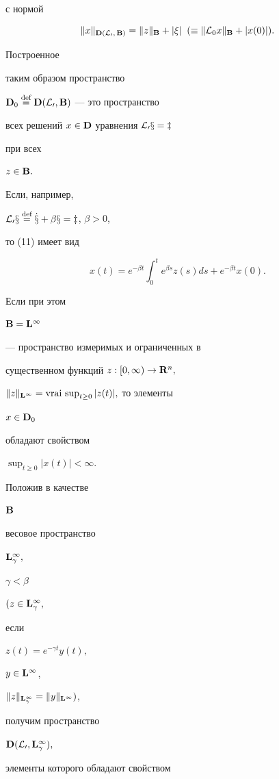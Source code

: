 с нормой


$$


\|x\|_{\bold D(\cal L_0,\,\bold B)}=\|z\|_{\bold B}+|\xi|\;\;


(\equiv\|{\cal L}_0 x\|_{\bold B}+|x(0)|).


$$


Построенное


таким образом пространство


$\bold D_0\overset{\text{def}}{=} \bold D(\cal L_0,\bold B)$ --- это пространство


всех решений $x\in\bold D$ уравнения $\cal L_0 x= z$


при всех


$z\in\bold B.$


Если, например,


$\cal L_0 x\overset{\text{def}}{=} \Dot x +\beta x = z$, $\beta > 0$,


то (11) имеет вид


$$


x(t) = e^{-\beta t} \int_0^t e^{\beta s}z(s)ds +e^{-\beta t} x(0).


$$


Если при этом


$\bold B = \bold L^\infty$


--- пространство измеримых и ограниченных в


существенном функций $z:[0,\infty)\to\bold R^n,$


$\|z\|_{\bold L^\infty} = \vraisup_{t\ge 0} |z(t)|,$ то элементы


$x\in\bold D_0$


обладают свойством


${\displaystyle \sup_{t\ge 0} |x(t)|<\infty.}$


Положив в качестве


$\bold B$


весовое пространство


$\bold L_{\gamma}^\infty,$


$\gamma<\beta$


$(z\in\bold L_\gamma^\infty,$


если


$z(t) = e^{-\gamma t} y(t),$


$y\in\bold L^\infty$,


$\|z\|_{\bold L_\gamma^\infty}=\|y\|_{\bold L^\infty})$,


получим пространство


$\bold D(\cal L_0,\bold L_\gamma^\infty),$


элементы которого обладают свойством


